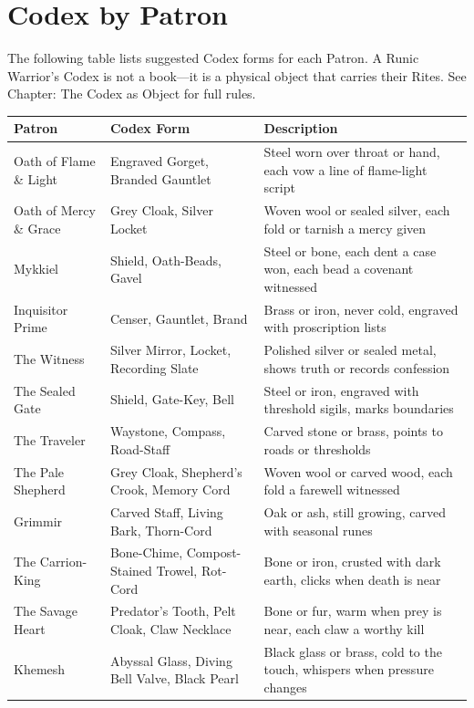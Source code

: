 \section{Codex by Patron}

The following table lists suggested Codex forms for each Patron. A Runic Warrior's Codex is not a book—it is a physical object that carries their Rites. See Chapter: The Codex as Object for full rules.

\begin{table}[h]
\centering
\small
\begin{tabular}{lll}
\hline
\textbf{Patron} & \textbf{Codex Form} & \textbf{Description} \\
\hline
Oath of Flame \& Light & Engraved Gorget, Branded Gauntlet & Steel worn over throat or hand, each vow a line of flame-light script \\
Oath of Mercy \& Grace & Grey Cloak, Silver Locket & Woven wool or sealed silver, each fold or tarnish a mercy given \\
Mykkiel & Shield, Oath-Beads, Gavel & Steel or bone, each dent a case won, each bead a covenant witnessed \\
Inquisitor Prime & Censer, Gauntlet, Brand & Brass or iron, never cold, engraved with proscription lists \\
The Witness & Silver Mirror, Locket, Recording Slate & Polished silver or sealed metal, shows truth or records confession \\
\hline
The Sealed Gate & Shield, Gate-Key, Bell & Steel or iron, engraved with threshold sigils, marks boundaries \\
The Traveler & Waystone, Compass, Road-Staff & Carved stone or brass, points to roads or thresholds \\
The Pale Shepherd & Grey Cloak, Shepherd's Crook, Memory Cord & Woven wool or carved wood, each fold a farewell witnessed \\
\hline
Grimmir & Carved Staff, Living Bark, Thorn-Cord & Oak or ash, still growing, carved with seasonal runes \\
The Carrion-King & Bone-Chime, Compost-Stained Trowel, Rot-Cord & Bone or iron, crusted with dark earth, clicks when death is near \\
The Savage Heart & Predator's Tooth, Pelt Cloak, Claw Necklace & Bone or fur, warm when prey is near, each claw a worthy kill \\
\hline
Khemesh & Abyssal Glass, Diving Bell Valve, Black Pearl & Black glass or brass, cold to the touch, whispers when pressure changes \\

\end{tabular}
\end{table}
